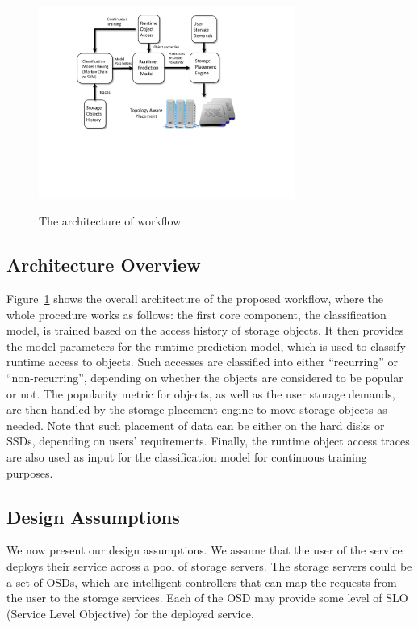 \begin{figure}[t]
\begin{centering}
  \includegraphics[width=3.3in]{./ModelPhase.pdf}
  \caption{The architecture of workflow}\label{fig:architecture}
  \label{arch}
\end{centering}
\vspace{-0.1in}
\end{figure}


\subsection{Architecture Overview}
\label{architecture}

Figure~\ref{arch} shows the overall architecture of the proposed workflow, where the whole procedure works as follows:  the first core component, the classification model, is trained based on the access history of storage objects. It then provides the model parameters for the runtime prediction model, which is used to classify runtime access to objects. Such accesses are classified into either ``recurring'' or ``non-recurring'', depending on whether the objects are considered to be popular or not. The popularity metric for objects, as well as the user storage demands, are then handled by the storage placement engine to move storage objects as needed. Note that such placement of data can be either on the hard disks or SSDs, depending on users' requirements. Finally, the runtime object access traces are also used as input for the classification model for continuous training purposes.


\subsection{Design Assumptions}

We now present our design assumptions. We assume that the user of the service deploys their service across a pool of storage servers. The storage servers could be a set of OSDs, which are intelligent controllers that can map the requests from the user to the storage services. Each of the OSD may provide some level of SLO (Service Level Objective) for the deployed service.

